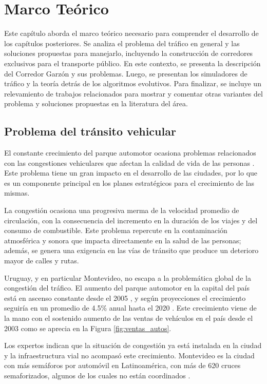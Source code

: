 \chapter{Marco Teórico}
Este capítulo aborda el marco teórico necesario para comprender el desarrollo de los capítulos posteriores. Se analiza el problema del tráfico en general y las soluciones propuestas para manejarlo, incluyendo la construcción de corredores exclusivos para el transporte público. En este contexto, se presenta la descripción del Corredor Garzón y sus problemas. Luego, se presentan los simuladores de tráfico y la teoría detrás de los algoritmos evolutivos. Para finalizar, se incluye un relevamiento de trabajos relacionados para mostrar y comentar otras variantes del problema y soluciones propuestas en la literatura del área.
\section{Problema del tránsito vehicular}

El constante crecimiento del parque automotor ocasiona problemas relacionados con las congestiones vehiculares que afectan la calidad de vida de las personas \citep{Cepal2003}. Este problema tiene un gran impacto en el desarrollo de las ciudades, por lo que es un componente principal en los planes estratégicos para el crecimiento de las mismas.

La congestión ocasiona una progresiva merma de la velocidad promedio de circulación, con la consecuencia del incremento en la duración de los viajes y del consumo de combustible. Este problema repercute en la contaminación atmosférica y sonora que impacta directamente en la salud de las personas; además, se genera una exigencia en las vías de tránsito que produce un deterioro mayor de calles y rutas.

Uruguay, y en particular Montevideo, no escapa a la problemática global de la congestión del tráfico. El aumento del parque automotor en la capital del país está en ascenso constante desde el 2005 \citep{INE2014}, y según proyecciones el crecimiento seguiría en un promedio de 4.5\% anual hasta el 2020 \citep{BBVA2013}. Este crecimiento viene de la mano con el sostenido aumento de las ventas de vehículos en el país desde el 2003 como se aprecia en la Figura \ref{fig:ventas_autos}.

Los expertos indican que la situación de congestión ya está instalada en la ciudad y la infraestructura vial no acompasó este crecimiento. Montevideo es la ciudad con más semáforos por automóvil en Latinoamérica, con más de 620 cruces semaforizados, algunos de los cuales no están coordinados \citep{Subrayado2013}.

